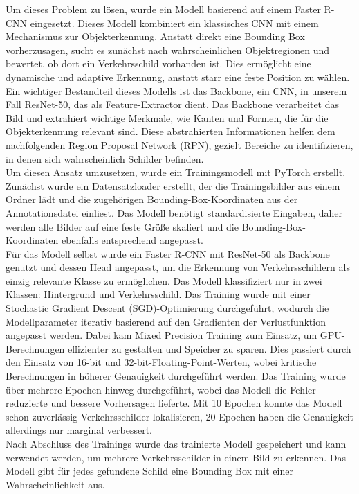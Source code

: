\documentclass[runningheads]{llncs}
\begin{document}
Um dieses Problem zu lösen, wurde ein Modell basierend auf einem Faster R-CNN eingesetzt.
Dieses Modell kombiniert ein klassisches CNN mit einem Mechanismus zur Objekterkennung.
Anstatt direkt eine Bounding Box vorherzusagen, sucht es zunächst nach wahrscheinlichen
Objektregionen und bewertet, ob dort ein Verkehrsschild vorhanden ist.
Dies ermöglicht eine dynamische und adaptive Erkennung, anstatt starr eine feste Position
zu wählen.
\\
Ein wichtiger Bestandteil dieses Modells ist das Backbone, ein CNN, in unserem Fall
ResNet-50, das als Feature-Extractor dient. Das Backbone verarbeitet das Bild und extrahiert
wichtige Merkmale, wie Kanten und Formen, die für die Objekterkennung relevant sind.
Diese abstrahierten Informationen helfen dem nachfolgenden Region Proposal Network (RPN),
gezielt Bereiche zu identifizieren, in denen sich wahrscheinlich Schilder befinden.
\\
Um diesen Ansatz umzusetzen, wurde ein Trainingsmodell mit PyTorch erstellt.
Zunächst wurde ein Datensatzloader erstellt, der die Trainingsbilder aus einem Ordner lädt
und die zugehörigen Bounding-Box-Koordinaten aus der Annotationsdatei einliest.
Das Modell benötigt standardisierte Eingaben, daher werden alle Bilder auf eine feste
Größe skaliert und die Bounding-Box-Koordinaten ebenfalls entsprechend angepasst.
\\
Für das Modell selbst wurde ein Faster R-CNN mit ResNet-50 als Backbone genutzt und dessen
Head angepasst, um die Erkennung von Verkehrsschildern als einzig relevante Klasse zu
ermöglichen. Das Modell klassifiziert nur in zwei Klassen: Hintergrund und Verkehrsschild.
Das Training wurde mit einer Stochastic Gradient Descent (SGD)-Optimierung durchgeführt,
wodurch die Modellparameter iterativ basierend auf den Gradienten der Verlustfunktion
angepasst werden. Dabei kam Mixed Precision Training zum Einsatz, um GPU-Berechnungen
effizienter zu gestalten und Speicher zu sparen. Dies passiert durch den Einsatz von
16-bit und 32-bit-Floating-Point-Werten, wobei kritische Berechnungen in höherer
Genauigkeit durchgeführt werden\cite{ref_mixed_precision_nvidia}.
Das Training wurde über mehrere Epochen hinweg durchgeführt, wobei das Modell die Fehler
reduzierte und bessere Vorhersagen lieferte. Mit 10 Epochen konnte das Modell schon
zuverlässig Verkehrsschilder lokalisieren, 20 Epochen haben die Genauigkeit allerdings nur
marginal verbessert.
\\
Nach Abschluss des Trainings wurde das trainierte Modell gespeichert und kann verwendet
werden, um mehrere Verkehrsschilder in einem Bild zu erkennen. Das Modell gibt für jedes
gefundene Schild eine Bounding Box mit einer Wahrscheinlichkeit aus.
\end{document}
